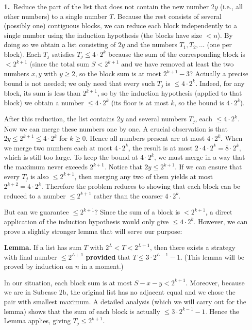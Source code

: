 \documentclass{llmxive}
\providecommand{\compactnumber}[2]{\par\noindent\textbf{#1.}~#2\par}
\begin{document}
\compactnumber{1}{Reduce the part of the list that does not contain the new number \(2y\) (i.e., all other numbers) to a single number \(T\).  Because the rest consists of several (possibly one) contiguous blocks, we can reduce each block independently to a single number using the induction hypothesis (the blocks have size \(< n\)).  By doing so we obtain a list consisting of \(2y\) and the numbers \(T_1, T_2, \dots\) (one per block).  Each \(T_j\) satisfies \(T_j \le 4 \cdot 2^{k}\) because the sum of the corresponding block is \(< 2^{k+1}\) (since the total sum \(S < 2^{k+1}\) and we have removed at least the two numbers \(x,y\) with \(y \ge 2\), so the block sum is at most \(2^{k+1} - 3\)?  Actually a precise bound is not needed; we only need that every such \(T_j\) is \(\le 4 \cdot 2^{k}\).  Indeed, for any block, its sum is less than \(2^{k+1}\), so by the induction hypothesis (applied to that block) we obtain a number \(\le 4 \cdot 2^{k}\) (its floor is at most \(k\), so the bound is \(4 \cdot 2^{k}\)).}
After this reduction, the list contains \(2y\) and several numbers \(T_j\), each \(\le 4 \cdot 2^{k}\). Now we can merge these numbers one by one. A crucial observation is that \(2y \le 2^{k+1} \le 4 \cdot 2^{k}\) for \(k \ge 0\). Hence all numbers present are at most \(4 \cdot 2^{k}\). When we merge two numbers each at most \(4 \cdot 2^{k}\), the result is at most \(2 \cdot 4 \cdot 2^{k} = 8 \cdot 2^{k}\), which is still too large. To keep the bound at \(4 \cdot 2^{k}\), we must merge in a way that the maximum never exceeds \(2^{k+1}\). Notice that \(2y \le 2^{k+1}\). If we can ensure that every \(T_j\) is also \(\le 2^{k+1}\), then merging any two of them yields at most \(2^{k+2} = 4 \cdot 2^{k}\). Therefore the problem reduces to showing that each block can be reduced to a number \(\le 2^{k+1}\) rather than the coarser \(4 \cdot 2^{k}\).\par
But can we guarantee \(\le 2^{k+1}\)? Since the sum of a block is \(< 2^{k+1}\), a direct application of the induction hypothesis would only give \(\le 4 \cdot 2^{k}\). However, we can prove a slightly stronger lemma that will serve our purpose:\par
\textbf{Lemma.} If a list has sum \(T\) with \(2^{L} < T < 2^{L+1}\), then there exists a strategy with final number \(\le 2^{L+1}\) \textbf{provided} that \(T \le 3 \cdot 2^{L-1} - 1\). (This lemma will be proved by induction on \(n\) in a moment.)\par
In our situation, each block sum is at most \(S - x - y < 2^{k+1}\). Moreover, because we are in Subcase 2b, the original list has no adjacent equal and we chose the pair with smallest maximum. A detailed analysis (which we will carry out for the lemma) shows that the sum of each block is actually \(\le 3 \cdot 2^{k-1} - 1\). Hence the Lemma applies, giving \(T_j \le 2^{k+1}\).\par
\end{document}
